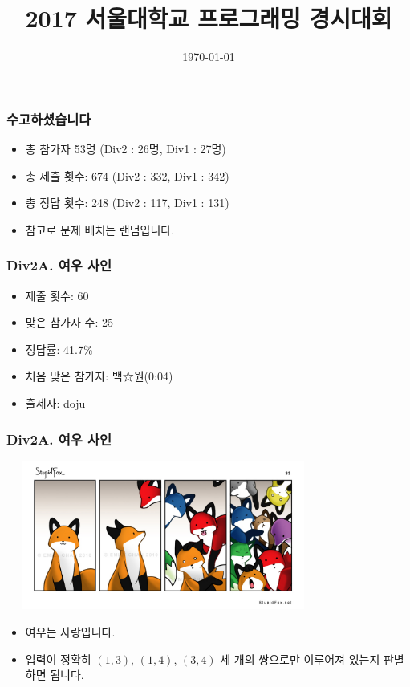 \documentclass[xetex]{beamer}
\begin{document}
\title{2017 서울대학교 프로그래밍 경시대회}
\date{\today}

\frame{\titlepage}

\begin{frame}
  \frametitle{수고하셨습니다}
  \begin{itemize}
    \item 총 참가자 53명 (Div2 : 26명, Div1 : 27명)
    \item 총 제출 횟수: 674 (Div2 : 332, Div1 : 342)
    \item 총 정답 횟수: 248 (Div2 : 117, Div1 : 131)
    \item 참고로 문제 배치는 랜덤입니다.
  \end{itemize}
\end{frame}

\begin{frame}
  \frametitle{Div2A. 여우 사인}
  \begin{itemize}
    \item 제출 횟수: 60
    \item 맞은 참가자 수: 25
    \item 정답률: 41.7\%
    \item 처음 맞은 참가자: 백☆원(0:04)
    \item 출제자: doju
  \end{itemize}
\end{frame}

\begin{frame}
  \frametitle{Div2A. 여우 사인}
  \begin{center}
    \includegraphics[width=0.7\textwidth]{stupidfox.jpg}
  \end{center}
  \begin{itemize}
    \item 여우는 사랑입니다.
    \item 입력이 정확히 $(1, 3)$, $(1, 4)$, $(3, 4)$ 세 개의 쌍으로만 이루어져 있는지 판별하면 됩니다.
  \end{itemize}
\end{frame}
\end{document}
